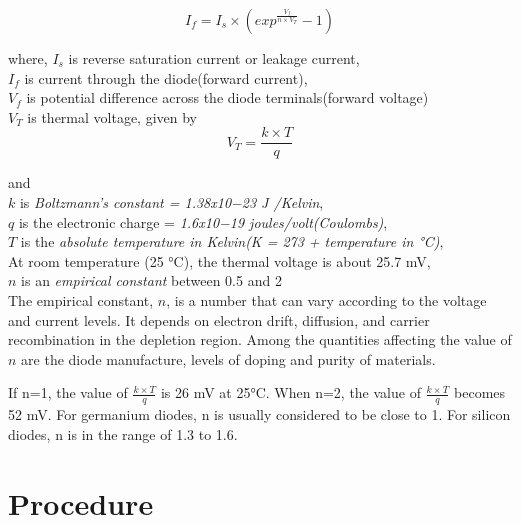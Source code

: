 			$$I_f=I_s \times (exp^\frac{V_f}{n \times{V_T}}-1)$$
			
			where,
			$I_s$ is reverse saturation current or leakage current,\\
			$I_f$ is current through the diode(forward current),\\
			$V_f$ is potential difference across the diode terminals(forward voltage)\\
			$V_T$ is thermal voltage, given by
			$$V_T=\frac{k \times T}{q}$$
			
			and\\
			$k$ is \textit{Boltzmann’s constant = 1.38x10−23 J /Kelvin},\\
			$q$ is the electronic charge = \textit{1.6x10−19 joules/volt(Coulombs)},\\
			$T$ is the \textit{absolute temperature in Kelvin(K = 273 + temperature in °C)},\\
			At room temperature (25 °C), the thermal voltage is about 25.7 mV,\\
			$n$ is an \textit{empirical constant} between 0.5 and 2\\
			
			The empirical constant, $n$, is a number that can vary according to the voltage and current levels. It depends on electron drift, diffusion, and carrier recombination in the depletion region. Among the quantities affecting the value of $n$ are the diode manufacture, levels of doping and purity of materials.
			
			If n=1, the value of $\frac{k \times T}{q}$ is 26 mV at 25°C.
			When n=2, the value of $\frac{k \times T}{q}$ becomes 52 mV. For germanium diodes, n is usually considered to be close to 1. For silicon diodes, n is in the range of 1.3 to 1.6.
		
	\section{Procedure}
